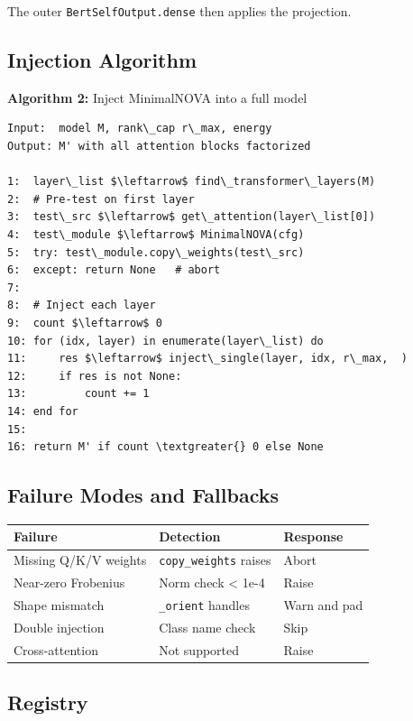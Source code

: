 The outer \texttt{BertSelfOutput.dense} then applies the projection.

\subsection{Injection Algorithm}

\textbf{Algorithm 2:} Inject MinimalNOVA into a full model
\begin{lstlisting}
Input:  model M, rank\_cap r\_max, energy  
Output: M' with all attention blocks factorized

1:  layer\_list $\leftarrow$ find\_transformer\_layers(M)
2:  # Pre-test on first layer
3:  test\_src $\leftarrow$ get\_attention(layer\_list[0])
4:  test\_module $\leftarrow$ MinimalNOVA(cfg)
5:  try: test\_module.copy\_weights(test\_src)
6:  except: return None   # abort
7:
8:  # Inject each layer
9:  count $\leftarrow$ 0
10: for (idx, layer) in enumerate(layer\_list) do
11:     res $\leftarrow$ inject\_single(layer, idx, r\_max,  )
12:     if res is not None:
13:         count += 1
14: end for
15:
16: return M' if count \textgreater{} 0 else None
\end{lstlisting}

\subsection{Failure Modes and Fallbacks}

\begin{table}[H]
\centering
\small
\begin{tabular}{lll}
\toprule
\textbf{Failure} & \textbf{Detection} & \textbf{Response} \\
\midrule
Missing Q/K/V weights & \texttt{copy\_weights} raises & Abort \\
Near-zero Frobenius & Norm check \textless{} 1e-4 & Raise \\
Shape mismatch & \texttt{\_orient} handles & Warn and pad \\
Double injection & Class name check & Skip \\
Cross-attention & Not supported & Raise \\
\bottomrule
\end{tabular}
\end{table}

\subsection{Registry}

